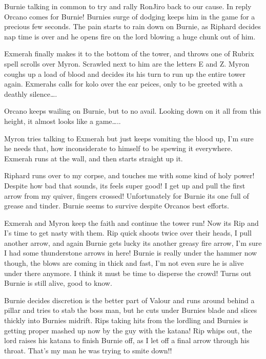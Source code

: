 Burnie talking in common to try and rally RonJiro back to our cause. In reply Orcano comes for Burnie! Burnies surge of dodging keeps him in the game for a precious few seconds. The pain starts to rain down on Burnie, as Riphard decides nap time is over and he opens fire on the lord blowing a huge chunk out of him.\medskip

Exmerah finally makes it to the bottom of the tower, and throws one of Rubrix spell scrolls over Myron. Scrawled next to him are the letters E and Z. Myron coughs up a load of blood and decides its his turn to run up the entire tower again. Exmerahs calls for kolo over the ear peices, only to be greeted with a deathly silence\ldots.\medskip

Orcano keeps wailing on Burnie, but to no avail. Looking down on it all from this height, it almost looks like a game\ldots..\medskip

Myron tries talking to Exmerah but just keeps vomiting the blood up, I'm sure he needs that, how inconsiderate to himself to be spewing it everywhere. Exmerah runs at the wall, and then starts straight up it.\medskip

Riphard runs over to my corpse, and touches me with some kind of holy power! Despite how bad that sounds, its feels super good!
I get up and pull the first arrow from my quiver, fingers crossed! Unfortunately for Burnie its one full of grease and tinder. Burnie seems to survive despite Orcanos best efforts.\medskip

Exmerah and Myron keep the faith and continue the tower run! Now its Rip and I's time to get nasty with them. Rip quick shoots twice over their heads, I pull another arrow, and again Burnie gets lucky its another greasy fire arrow, I'm sure I had some thunderstone arrows in here! Burnie is really under the hammer now though, the blows are coming in thick and fast, I'm not even sure he is alive under there anymore. I think it must be time to disperse the crowd! Turns out Burnie is still alive, good to know.\medskip

Burnie decides discretion is the better part of Valour and runs around behind a pillar and tries to stab the boss man, but he cuts under Burnies blade and slices thickly into Burnies midrift. Rips taking hits from the lordling and Burnies is getting proper mashed up now by the guy with the katana! Rip whips out, the lord raises his katana to finish Burnie off, as I let off a final arrow through his throat. That's my man he was trying to smite down!!\medskip

